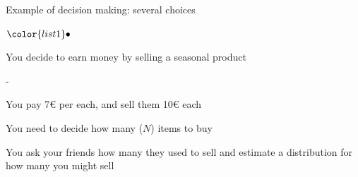 \documentclass[t]{beamer}
\newenvironment{list1}{
   \begin{list}{$\color{list1}\bullet$}{\itemsep=6pt}}{
  \end{list}}
\newenvironment{list2}{
  \begin{list}{-}{\baselineskip=12pt\itemsep=2pt}}{
  \end{list}}
\begin{document}
\begin{frame}{Example of decision making: several choices}

\begin{list1}
\item You decide to earn money by selling a seasonal product
  \begin{list2}
  \item You pay 7€ per each, and sell them 10€ each
  \item You need to decide how many ($N$) items to buy
  \item<2-> You ask your friends how many they used to sell and estimate a
    distribution for how many you might sell
  \end{list2}
\end{list1}

\end{frame}
\end{document}
